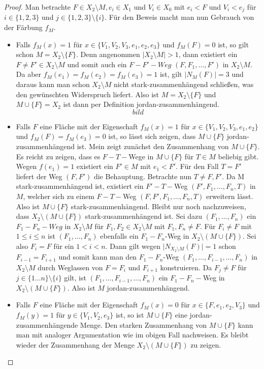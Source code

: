 \documentclass[12pt,titlepage]{article}
\begin{document}
\begin{proof}
Man betrachte $F \in X_2\setminus M,e_i \in X_1$ und $V_i\in X_0$ mit $e_i<F$ und $V_i<e_j$ für $i\in \{1,2,3\}$ und $j \in \{1,2,3\} \setminus \{ i \}$. Für den Beweis macht man nun Gebrauch von der Färbung $f_M$. 
\begin{itemize}
\item Falls $f_M(x)=1$ für $x\in \{V_1,V_2,V_3,e_1,e_2,e_3\}$ und $f_M(F)=0$ ist, so gilt schon $M=X_2\setminus \{F\}$. Denn angenommen $\vert X_2 \setminus M \vert > 1$, dann existiert ein $F \neq F' \in X_2 \setminus M $ und somit auch ein $F-F'-Weg$ $(F,F_1,\ldots,F')$ in $X_2 \setminus M$. Da aber $f_M(e_1)=f_M(e_2)=f_M(e_3)=1$ ist, gilt $\vert N_M(F)\vert =3$ und daraus kann man schon $X_2 \setminus M$ nicht stark-zusammenhängend schließen, was den gewünschten Widerspruch liefert. Also ist $M=X_2 \setminus \{F\}$ und $M \cup \{F\}=X_2$ ist dann per Definition jordan-zusammenhängend.
\[
bild
\]
\item Falls $F$ eine Fläche mit der Eigenschaft $f_M(x)=1$ für $x \in \{V_1,V_2,V_3,e_1,e_2\}$ und $f_M(F)=f_M(e_3)=0$ ist, so  lässt sich zeigen, dass $M \cup \{F\}$ jordan-zusammenhängend ist. Mein zeigt zunächst den Zusammenhang von $M\cup \{F\}$. Es reicht zu zeigen, dass es $F-T-$Wege in $M\cup \{F\}$ für $T \in M$ beliebig gibt.
Wegen $f(e_1)=1$ existiert ein $F'\in M$ mit $e_1<F'$. Für den Fall $T=F'$ liefert der Weg $(F,F')$ die Behauptung. Betrachte nun $T \neq F,F'$. Da M stark-zusammenhängend ist, existiert ein $F'-T-$Weg $(F',F_1,\ldots,F_n,T)$ in $M$, welcher sich zu einem $F-T-$Weg $(F,F',F_1,\ldots,F_n,T)$ erweitern lässt. Also ist $M \cup \{F\}$ stark-zusammenhängend. Bleibt nur noch nachzuweisen, dass $X_2\setminus (M\cup \{F\})$ stark-zusammenhängend ist. Sei dazu $(F_1,\ldots,F_n)$ ein $F_1-F_n-Weg$ in $X_2 \setminus M $ für $F_1,F_2 \in X_2\setminus M$ mit $F_1,F_n \neq F$. Für $F_i \neq F$ mit $1 \leq i \leq n$ ist $(F_1,\ldots,F_n)$ ebenfalls ein $F_1-F_n$-Weg in $X_2 \setminus (M \cup \{F\})$. Sei also $F_i=F$ für ein $1<i<n$. Dann gilt wegen $\vert N_{X_2\setminus M}(F) \vert=1$ schon $F_{i-1}=F_{i+1}$ und somit kann man den $F_1-F_n$-Weg $(F_1,\ldots,F_{i-1},\ldots,F_n)$ in $X_2\setminus M$ durch Weglassen von $F=F_i$ und $F_{i+1}$ konstruieren. Da $F_j\neq F$ für $j \in \{1\ldots n\}\setminus \{i\}$ gilt, ist $(F_1,\ldots,F_{i-1},\ldots,F_n)$ ein $F_1-F_n-$Weg in $X_2 \setminus (M \cup \{F\})$. Also ist $M$ jordan-zusammenhängend.
\item Falls $F$ eine Fläche mit der Eigenschaft $f_M(x)=0$ für $x \in \{F,e_1,e_2,V_3\}$ und $f_M(y)=1$ für $y \in \{V_1,V_2,e_3\}$ ist, so ist $M \cup \{F\}$ eine jordan-zusammenhängende Menge. Den starken Zusammenhang von $M \cup \{F\}$ kann man mit analoger Argumentation wie im obigen Fall nachweisen. Es bleibt wieder der Zusammenhang der Menge $X_2\setminus (M \cup \{F\})$ zu zeigen.

\end{itemize}
\end{proof}
\end{document}
